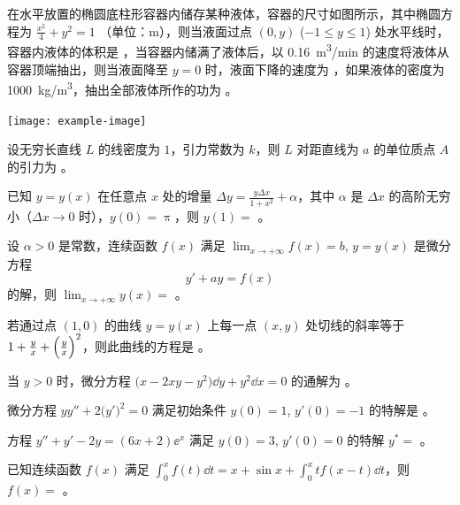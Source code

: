 \begin{ti}
	在水平放置的椭圆底柱形容器内储存某种液体，容器的尺寸如图所示，其中椭圆方程为 $\frac{x^2}{4} + y^2 = 1$ （单位：\si{m}），则当液面过点 $(0,y)$ ($-1 \leq y \leq 1$) 处水平线时，容器内液体的体积是 \hua，当容器内储满了液体后，以 \SI{0.16}{m^3/min} 的速度将液体从容器顶端抽出，则当液面降至 $y = 0$ 时，液面下降的速度为 \hua，如果液体的密度为 \SI{1000}{kg/m^3}，抽出全部液体所作的功为 \hua。
	\begin{center}
		\texttt{[image: example-image]}
	\end{center}
\end{ti}

\begin{ti}
	设无穷长直线 $L$ 的线密度为 $1$，引力常数为 $k$，则 $L$ 对距直线为 $a$ 的单位质点 $A$ 的引力为 \hua。
\end{ti}

\begin{ti}
	已知 $y = y(x)$ 在任意点 $x$ 处的增量 $\Delta y = \frac{y \Delta x}{1 + x^2} + \alpha$，其中 $\alpha$ 是 $\Delta x$ 的高阶无穷小（$\Delta x \to 0$ 时），$y(0) = \uppi$，则 $y(1) = $ \hua。
\end{ti}

\begin{ti}
	设 $\alpha > 0$ 是常数，连续函数 $f(x)$ 满足 $\lim_{x \to +\infty} f(x) = b$, $y = y(x)$ 是微分方程
	\[
		y' + ay = f(x)
	\]
	的解，则 $\lim_{x \to +\infty} y(x) = $ \hua。
\end{ti}

\begin{ti}
	若通过点 $(1,0)$ 的曲线 $y = y(x)$ 上每一点 $(x,y)$ 处切线的斜率等于 $1 + \frac{y}{x} + \Bigl( \frac{y}{x} \Bigr)^2$，则此曲线的方程是 \hua。
\end{ti}

\begin{ti}
	当 $y > 0$ 时，微分方程 $\bigl( x - 2xy - y^2 \bigr) \dd{y} + y^2 \dd{x} = 0$ 的通解为 \hua。
\end{ti}

\begin{ti}
	微分方程 $yy'' + 2\bigl( y' \bigr)^2 = 0$ 满足初始条件 $y(0) = 1$, $y'(0) = -1$ 的特解是 \hua。
\end{ti}

\begin{ti}
	方程 $y'' + y' - 2y = (6x + 2) \ee^x$ 满足 $y(0) = 3$, $y'(0) = 0$ 的特解 $y^\ast = $ \hua。
\end{ti}

\begin{ti}
	已知连续函数 $f(x)$ 满足 $\int_0^x f(t) \dd{t} = x + \sin x + \int_0^x t f(x-t) \dd{t}$，则 $f(x) = $ \hua。
\end{ti}

